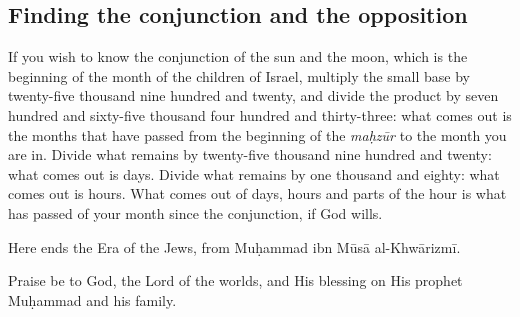 \documentclass[11pt]{article}
\begin{document}
\subsection*{Finding the conjunction and the opposition}

If you wish to know the conjunction of the sun and the moon, which is the beginning of the month of the children of Israel, multiply the small base by twenty-five thousand nine hundred and twenty, and divide the product by seven hundred and sixty-five thousand four hundred and thirty-three: what comes out is the months that have passed from the beginning of the \textit{maḥzūr} to the month you are in. Divide what remains by twenty-five thousand nine hundred and twenty: what comes out is days. Divide what remains by one thousand and eighty: what comes out is hours. What comes out of days, hours and parts of the hour is what has passed of your month since the conjunction, if God wills.

\begin{center}Here ends the Era of the Jews, from Muḥammad ibn Mūsā al-Khwārizmī.\end{center}

\begin{center}Praise be to God, the Lord of the worlds, and His blessing on His prophet Muḥammad and his family.\end{center}
\end{document}
